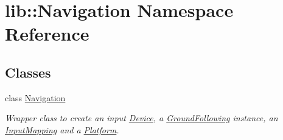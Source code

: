 \hypertarget{namespacelib_1_1Navigation}{\section{lib\-:\-:\-Navigation \-Namespace \-Reference}
\label{namespacelib_1_1Navigation}
}
\subsection*{\-Classes}
\begin{DoxyCompactItemize}
\item 
class \hyperlink{classlib_1_1Navigation_1_1Navigation}{\-Navigation}
\begin{DoxyCompactList}\small\item\em \-Wrapper class to create an input \hyperlink{namespacelib_1_1Device}{\-Device}, a \hyperlink{namespacelib_1_1GroundFollowing}{\-Ground\-Following} instance, an \hyperlink{namespacelib_1_1InputMapping}{\-Input\-Mapping} and a \hyperlink{namespacelib_1_1Platform}{\-Platform}. \end{DoxyCompactList}\end{DoxyCompactItemize}
